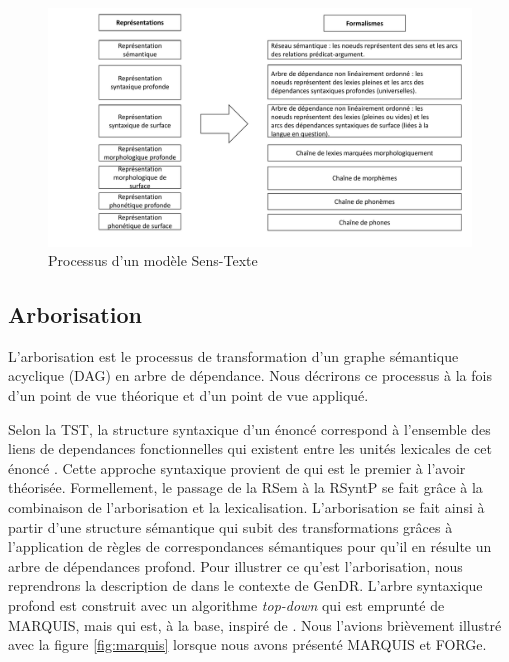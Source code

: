 \begin{figure}[htb]
	\centering
	\includegraphics[width=1\textwidth, trim = {0cm 1cm 0cm 0cm},clip]{ch3/figs/polguere2.pdf}
	\caption{Processus d'un modèle Sens-Texte \citep{PolgueretheorieSensTexte1998}}
	\label{fig:processustst}
\end{figure}


\subsection{Arborisation}\label{sec:arbo}

L'arborisation est le processus de transformation d'un graphe sémantique acyclique (DAG) en arbre de dépendance. Nous décrirons ce processus à la fois d'un point de vue théorique et d'un point de vue appliqué.

Selon la \ac{TST}, la structure syntaxique d'un énoncé correspond à l'ensemble des liens de dependances fonctionnelles qui existent entre les unités lexicales de cet énoncé \citep{melcuk1988}. Cette approche syntaxique provient de \cite{TesniereElementssyntaxestructurale1965} qui est le premier à l'avoir théorisée. Formellement, le passage de la \ac{RSem} à la \ac{RSyntP} se fait grâce à la combinaison de l'arborisation et la lexicalisation. L'arborisation se fait ainsi à partir d'une structure sémantique qui subit des transformations grâces à l'application de règles de correspondances sémantiques pour qu'il en résulte un arbre de dépendances profond. Pour illustrer ce qu'est l'arborisation, nous reprendrons la description de \cite{lareau18} dans le contexte de GenDR. L'arbre syntaxique profond est construit avec un algorithme \emph{top-down} qui est emprunté de MARQUIS, mais qui est, à la base, inspiré de \cite{PolguereStructurationmisejeu1990}. Nous l'avions brièvement illustré avec la figure \ref{fig:marquis} lorsque nous avons présenté MARQUIS et FORGe.

